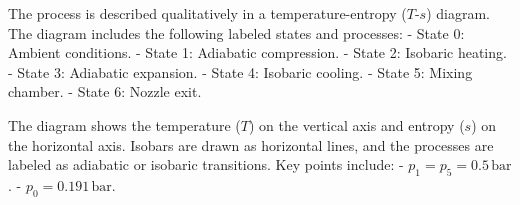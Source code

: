 The process is described qualitatively in a temperature-entropy (\( T \)-\( s \)) diagram. The diagram includes the following labeled states and processes:  
- State 0: Ambient conditions.  
- State 1: Adiabatic compression.  
- State 2: Isobaric heating.  
- State 3: Adiabatic expansion.  
- State 4: Isobaric cooling.  
- State 5: Mixing chamber.  
- State 6: Nozzle exit.  

The diagram shows the temperature (\( T \)) on the vertical axis and entropy (\( s \)) on the horizontal axis. Isobars are drawn as horizontal lines, and the processes are labeled as adiabatic or isobaric transitions. Key points include:  
- \( p_1 = p_5 = 0.5 \, \text{bar} \).  
- \( p_0 = 0.191 \, \text{bar} \).
